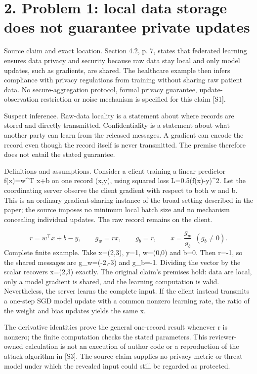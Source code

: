 \documentclass[10pt]{article}
\begin{document}
\section*{2. Problem 1: local data storage does not guarantee private updates}
Source claim and exact location. Section 4.2, p. 7, states that federated learning ensures data privacy and security because raw data stay local and only model updates, such as gradients, are shared. The healthcare example then infers compliance with privacy regulations from training without sharing raw patient data. No secure-aggregation protocol, formal privacy guarantee, update-observation restriction or noise mechanism is specified for this claim [S1].\par
Suspect inference. Raw-data locality is a statement about where records are stored and directly transmitted. Confidentiality is a statement about what another party can learn from the released messages. A gradient can encode the record even though the record itself is never transmitted. The premise therefore does not entail the stated guarantee.\par
Definitions and assumptions. Consider a client training a linear predictor f(x)=w\textasciicircum{}T x+b on one record (x,y), using squared loss L=0.5(f(x)-y)\textasciicircum{}2. Let the coordinating server observe the client gradient with respect to both w and b. This is an ordinary gradient-sharing instance of the broad setting described in the paper; the source imposes no minimum local batch size and no mechanism concealing individual updates. The raw record remains on the client.\par
\[r=w^\top x+b-y,\qquad g_w=rx,\qquad g_b=r,\qquad x=\frac{g_w}{g_b}\ \ (g_b\ne0).\] Complete finite example. Take x=(2,3), y=1, w=(0,0) and b=0. Then r=-1, so the shared messages are g\_w=(-2,-3) and g\_b=-1. Dividing the vector by the scalar recovers x=(2,3) exactly. The original claim’s premises hold: data are local, only a model gradient is shared, and the learning computation is valid. Nevertheless, the server learns the complete input. If the client instead transmits a one-step SGD model update with a common nonzero learning rate, the ratio of the weight and bias updates yields the same x.\par
The derivative identities prove the general one-record result whenever r is nonzero; the finite computation checks the stated parameters. This reviewer-owned calculation is not an execution of author code or a reproduction of the attack algorithm in [S3]. The source claim supplies no privacy metric or threat model under which the revealed input could still be regarded as protected.\par
\end{document}

